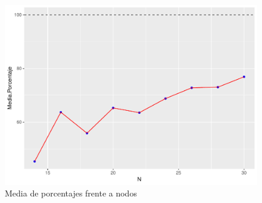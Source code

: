 \documentclass[twoside,a4paper,openright,12pt]{book}
\begin{document}
\begin{figure}[h!]
\centering
\includegraphics[scale=0.7]{plot11}
\caption{Media de porcentajes frente a nodos}
\end{figure}
\end{document}

